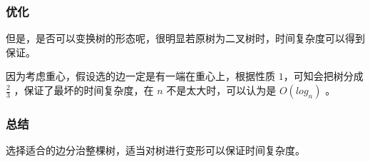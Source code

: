 \documentclass[UTF8]{ctexbeamer}
\begin{document}
        \begin{frame}
            \frametitle{优化}
            但是，是否可以变换树的形态呢，很明显若原树为二叉树时，时间复杂度可以得到保证。

            因为考虑重心，假设选的边一定是有一端在重心上，根据性质 $1$，可知会把树分成 $\frac 2 3$ ，保证了最坏的时间复杂度，在 $n$ 不是太大时，可以认为是 $O(log_n)$ 。
        \end{frame}
        
        \begin{frame}
            \frametitle{总结}
            选择适合的边分治整棵树，适当对树进行变形可以保证时间复杂度。
        \end{frame}
\end{document}

